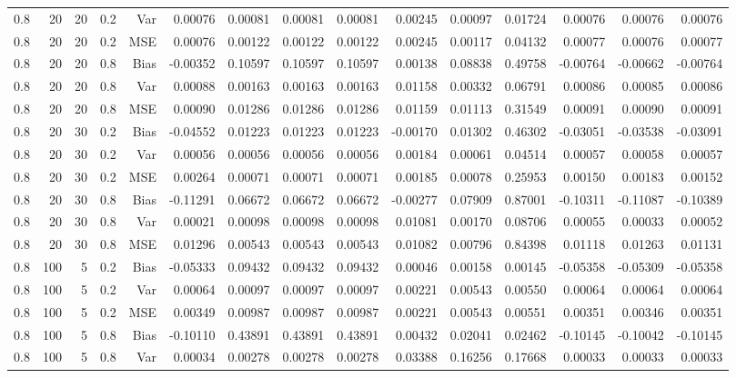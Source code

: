 \begin{table}[!htbp]
\begin{tabular}{lrrrrrrrrrrrrrr}
0.8 &  20 & 20 & 0.2 & Var & 0.00076 & 0.00081 & 0.00081 & 0.00081 & 0.00245 & 0.00097 & 0.01724 & 0.00076 & 0.00076 & 0.00076 \\
0.8 &  20 & 20 & 0.2 & MSE & 0.00076 & 0.00122 & 0.00122 & 0.00122 & 0.00245 & 0.00117 & 0.04132 & 0.00077 & 0.00076 & 0.00077 \\
0.8 &  20 & 20 & 0.8 & Bias & -0.00352 & 0.10597 & 0.10597 & 0.10597 & 0.00138 & 0.08838 & 0.49758 & -0.00764 & -0.00662 & -0.00764 \\
0.8 &  20 & 20 & 0.8 & Var & 0.00088 & 0.00163 & 0.00163 & 0.00163 & 0.01158 & 0.00332 & 0.06791 & 0.00086 & 0.00085 & 0.00086 \\
0.8 &  20 & 20 & 0.8 & MSE & 0.00090 & 0.01286 & 0.01286 & 0.01286 & 0.01159 & 0.01113 & 0.31549 & 0.00091 & 0.00090 & 0.00091 \\
0.8 &  20 & 30 & 0.2 & Bias & -0.04552 & 0.01223 & 0.01223 & 0.01223 & -0.00170 & 0.01302 & 0.46302 & -0.03051 & -0.03538 & -0.03091 \\
0.8 &  20 & 30 & 0.2 & Var & 0.00056 & 0.00056 & 0.00056 & 0.00056 & 0.00184 & 0.00061 & 0.04514 & 0.00057 & 0.00058 & 0.00057 \\
0.8 &  20 & 30 & 0.2 & MSE & 0.00264 & 0.00071 & 0.00071 & 0.00071 & 0.00185 & 0.00078 & 0.25953 & 0.00150 & 0.00183 & 0.00152 \\
0.8 &  20 & 30 & 0.8 & Bias & -0.11291 & 0.06672 & 0.06672 & 0.06672 & -0.00277 & 0.07909 & 0.87001 & -0.10311 & -0.11087 & -0.10389 \\
0.8 &  20 & 30 & 0.8 & Var & 0.00021 & 0.00098 & 0.00098 & 0.00098 & 0.01081 & 0.00170 & 0.08706 & 0.00055 & 0.00033 & 0.00052 \\
0.8 &  20 & 30 & 0.8 & MSE & 0.01296 & 0.00543 & 0.00543 & 0.00543 & 0.01082 & 0.00796 & 0.84398 & 0.01118 & 0.01263 & 0.01131 \\
0.8 & 100 &  5 & 0.2 & Bias & -0.05333 & 0.09432 & 0.09432 & 0.09432 & 0.00046 & 0.00158 & 0.00145 & -0.05358 & -0.05309 & -0.05358 \\
0.8 & 100 &  5 & 0.2 & Var & 0.00064 & 0.00097 & 0.00097 & 0.00097 & 0.00221 & 0.00543 & 0.00550 & 0.00064 & 0.00064 & 0.00064 \\
0.8 & 100 &  5 & 0.2 & MSE & 0.00349 & 0.00987 & 0.00987 & 0.00987 & 0.00221 & 0.00543 & 0.00551 & 0.00351 & 0.00346 & 0.00351 \\
0.8 & 100 &  5 & 0.8 & Bias & -0.10110 & 0.43891 & 0.43891 & 0.43891 & 0.00432 & 0.02041 & 0.02462 & -0.10145 & -0.10042 & -0.10145 \\
0.8 & 100 &  5 & 0.8 & Var & 0.00034 & 0.00278 & 0.00278 & 0.00278 & 0.03388 & 0.16256 & 0.17668 & 0.00033 & 0.00033 & 0.00033 \\

\end{tabular}
\end{table}
